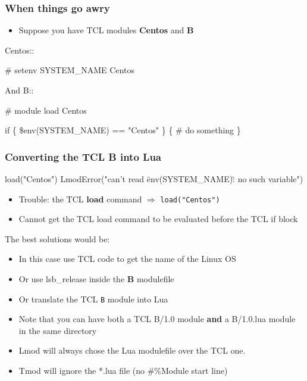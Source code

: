 \documentclass{beamer}
\begin{document}
\begin{frame}[fragile]
    \frametitle{When things go awry}
  \begin{itemize}
    \item Suppose you have TCL modules \textbf{Centos} and \textbf{B}
  \end{itemize}
 {\tiny
    \begin{semiverbatim}
Centos::

    #%
    setenv SYSTEM\_NAME Centos

And B::

    #%
    module load Centos

    if \{ \$env(SYSTEM\_NAME) == "Centos" \} \{
       # do something
    \}

    \end{semiverbatim}
}
\end{frame}

\begin{frame}[fragile]
    \frametitle{Converting the TCL \textbf{B} into Lua}
 {\tiny
    \begin{semiverbatim}
   load("Centos")
   LmodError("can't read \"env(SYSTEM\_NAME)\": no such variable")
    \end{semiverbatim}
}
  \begin{itemize}
    \item Trouble: the TCL \textbf{load} command $\Rightarrow$
      \texttt{load("Centos")}
    \item Cannot get the TCL load command to be evaluated before the
      TCL if block
  \end{itemize}

\end{frame}


\begin{frame}{The best solutions would be: }
  \begin{itemize}
    \item In this case use TCL code to get the name of the Linux OS 
    \item Or use lsb\_release inside the \textbf{B} modulefile
    \item Or translate the TCL \texttt{B} module into Lua
    \item Note that you can have both a TCL B/1.0 module \textbf{and}
      a B/1.0.lua module in the same directory
    \item Lmod will always chose the Lua modulefile over the TCL one.
    \item Tmod will ignore the *.lua file (no \#\%Module start line)
  \end{itemize}
\end{frame}
\end{document}

